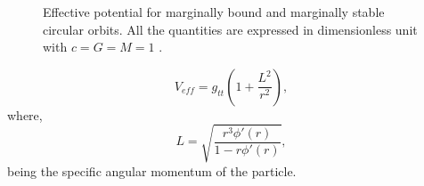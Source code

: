 \documentclass[12pt,a4paper,oneside]{book}
\newcommand{\eq}[2]{\begin{equation} \label{eq:#1} #2 \end{equation}}
\begin{document}
   \begin{figure}[!htbp]
     \hfill
     \caption{Effective potential for marginally bound and marginally stable circular orbits. All the quantities are expressed in dimensionless unit with $c=G=M=1$ \cite{Kalita_Bani}.}
     \label{marginal orbits}
   \end{figure}
\eq{}{V_{eff} = g_{tt}\left(1+\frac{L^2}{r^2}\right) ,}
where,
\eq{}{L = \sqrt{\frac{r^3\phi'(r)}{1-r\phi'(r)}},}
being the specific angular momentum of the particle.
\end{document}
